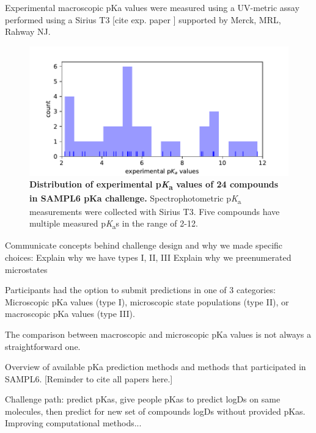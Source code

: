 \documentclass[9pt,lineno]{elife}
\newcommand{\pKa}{p\textit{K}\textsubscript{a}}
\begin{document}


Experimental macroscopic pKa values were measured using a UV-metric assay performed using a Sirius T3 [cite exp. paper ]  supported by Merck, MRL,  Rahway NJ.  

\begin{figure}
\begin{center}
\includegraphics[width=0.65\linewidth]{figures/distribution_of_exp_pKas.pdf}
\caption{{\bf Distribution of experimental \pKa{} values of 24 compounds in SAMPL6 pKa challenge. } Spectrophotometric \pKa{} measurements were collected with Sirius T3.  Five compounds have multiple measured \pKa{}s in the range of 2-12.   
}
\label{fig:dist_exp_pKas}
\end{center}
\end{figure}

Communicate concepts behind challenge design and why we made specific choices:
Explain why we have types I, II, III
Explain why we preenumerated microstates

Participants had the option to submit predictions in one of 3 categories: Microscopic pKa values (type I), microscopic state populations (type II), or macroscopic pKa values (type III).

The comparison between macroscopic and microscopic pKa values is not always a straightforward one. 

Overview of available pKa prediction methods and methods that participated in SAMPL6. [Reminder to cite all papers here.]


Challenge path: predict pKas, give people pKas to predict logDs on same molecules, then predict for new set of compounds logDs without provided pKas.
Improving computational methods...
\end{document}
